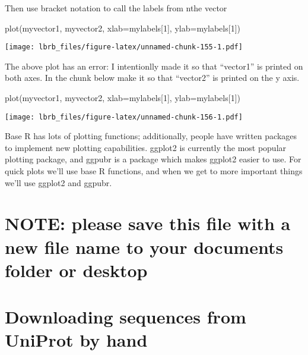 \documentclass[
]{book}
\newenvironment{Shaded}{\begin{snugshade}}{\end{snugshade}}
\newcommand{\AttributeTok}[1]{\textcolor[rgb]{0.77,0.63,0.00}{#1}}
\newcommand{\DecValTok}[1]{\textcolor[rgb]{0.00,0.00,0.81}{#1}}
\newcommand{\FunctionTok}[1]{\textcolor[rgb]{0.00,0.00,0.00}{#1}}
\newcommand{\NormalTok}[1]{#1}
\begin{document}
Then use bracket notation to call the labels from nthe vector

\begin{Shaded}
\begin{Highlighting}[]
\FunctionTok{plot}\NormalTok{(myvector1, }
\NormalTok{     myvector2, }
     \AttributeTok{xlab=}\NormalTok{mylabels[}\DecValTok{1}\NormalTok{],}
     \AttributeTok{ylab=}\NormalTok{mylabels[}\DecValTok{1}\NormalTok{])}
\end{Highlighting}
\end{Shaded}

\texttt{[image: lbrb\_files/figure-latex/unnamed-chunk-155-1.pdf]}

The above plot has an error: I intentionlly made it so that ``vector1'' is printed on both axes. In the chunk below make it so that ``vector2'' is printed on the y axis.

\begin{Shaded}
\begin{Highlighting}[]
\FunctionTok{plot}\NormalTok{(myvector1, }
\NormalTok{     myvector2, }
     \AttributeTok{xlab=}\NormalTok{mylabels[}\DecValTok{1}\NormalTok{],}
     \AttributeTok{ylab=}\NormalTok{mylabels[}\DecValTok{1}\NormalTok{])}
\end{Highlighting}
\end{Shaded}

\texttt{[image: lbrb\_files/figure-latex/unnamed-chunk-156-1.pdf]}

Base R has lots of plotting functions; additionally, people have written packages to implement new plotting capabilities. ggplot2 is currently the most popular plotting package, and ggpubr is a package which makes ggplot2 easier to use. For quick plots we'll use base R functions, and when we get to more important things we'll use ggplot2 and ggpubr.

\hypertarget{note-please-save-this-file-with-a-new-file-name-to-your-documents-folder-or-desktop}{%
\chapter{NOTE: please save this file with a new file name to your documents folder or desktop}\label{note-please-save-this-file-with-a-new-file-name-to-your-documents-folder-or-desktop}}

\hypertarget{downloading-sequences-from-uniprot-by-hand}{%
\chapter{Downloading sequences from UniProt by hand}\label{downloading-sequences-from-uniprot-by-hand}}
\end{document}
